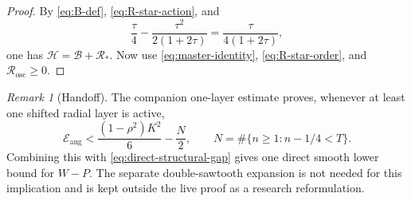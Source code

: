 \documentclass[11pt]{article}
\theoremstyle{remark}
\newtheorem{remark}[lemma]{Remark}
\begin{document}
\begin{proof}
By \eqref{eq:B-def}, \eqref{eq:R-star-action}, and
\[
 \frac\tau4-\frac{\tau^2}{2(1+2\tau)}
 =\frac{\tau}{4(1+2\tau)},
\]
one has $\mathcal H=\mathcal B+\mathcal R_*$.  Now use
\eqref{eq:master-identity},
\eqref{eq:R-star-order}, and $\mathcal R_{\mathrm{osc}}\geq0$.
\end{proof}

\begin{remark}[Handoff]
The companion one-layer estimate proves, whenever at least one shifted
radial layer is active,
\[
 \mathcal E_{\mathrm{ang}}
 <\frac{(1-\rho^2)K^2}{6}-\frac N2,
 \qquad N=\#\{n\geq1:n-1/4<T\}.
\]
Combining this with \eqref{eq:direct-structural-gap} gives one direct smooth
lower bound for $W-P$.  The separate double-sawtooth expansion is not needed
for this implication and is kept outside the live proof as a research
reformulation.
\end{remark}
\end{document}
